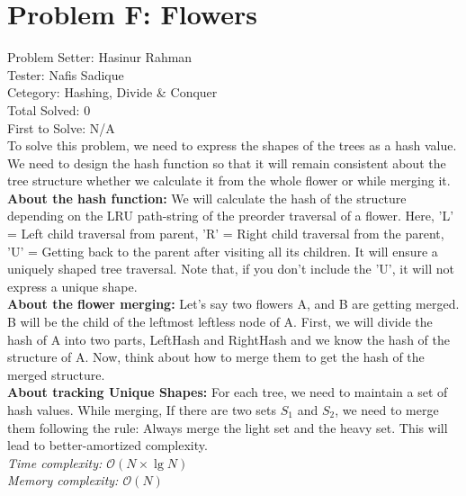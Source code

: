\section*{Problem F: Flowers}
Problem Setter: Hasinur Rahman \\
Tester: Nafis Sadique \\
Cetegory: Hashing, Divide \& Conquer \\
Total Solved: 0 \\
First to Solve: N/A \\

To solve this problem, we need to express the shapes of the trees as a hash value. We need to design the hash function so that it will remain consistent about the tree structure whether we calculate it from the whole flower or while merging it.\\
\textbf{About the hash function:} We will calculate the hash of the structure depending on the LRU path-string of the preorder traversal of a flower. Here, 'L' = Left child traversal from parent, 'R' = Right child traversal from the parent, 'U' = Getting back to the parent after visiting all its children. It will ensure a uniquely shaped tree traversal. Note that, if you don't include the 'U', it will not express a unique shape.\\
\textbf{About the flower merging:} Let's say two flowers A, and B are getting merged. B will be the child of the leftmost leftless node of A. First, we will divide the  hash of A into two parts, LeftHash and RightHash and we know the hash of the structure of A. Now, think about how to merge them to get the hash of the merged structure.\\
\textbf{About tracking Unique Shapes:} For each tree, we need to maintain a set of hash values. While merging, If there are two sets $S_{1}$ and $S_{2}$, we need to merge them following the rule: Always merge the light set and the heavy set. This will lead to better-amortized complexity.\\
\textit{Time complexity: $\mathcal{O}(N\times\lg{N})$}\\
\textit{Memory complexity: $\mathcal{O}(N)$}\\